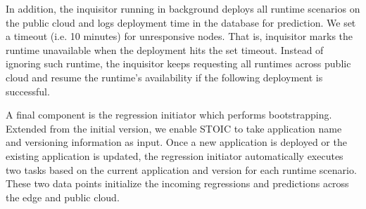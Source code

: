 In addition, the inquisitor running in background deploys all runtime scenarios on the public cloud and logs deployment time in the database for prediction. We set a timeout (i.e. 10 minutes) for unresponsive nodes. That is, inquisitor marks the runtime unavailable when the deployment hits the set timeout. Instead of ignoring such runtime, the inquisitor keeps requesting all runtimes across public cloud and resume the runtime's availability if the following deployment is successful.

A final component is the regression initiator which performs bootstrapping. Extended from the initial version, we enable STOIC to take application name and versioning information as input. Once a new application is deployed or the existing application is updated, the regression initiator automatically executes two tasks based on the current application and version for each runtime scenario. These two data points initialize the incoming regressions and predictions across the edge and public cloud.

